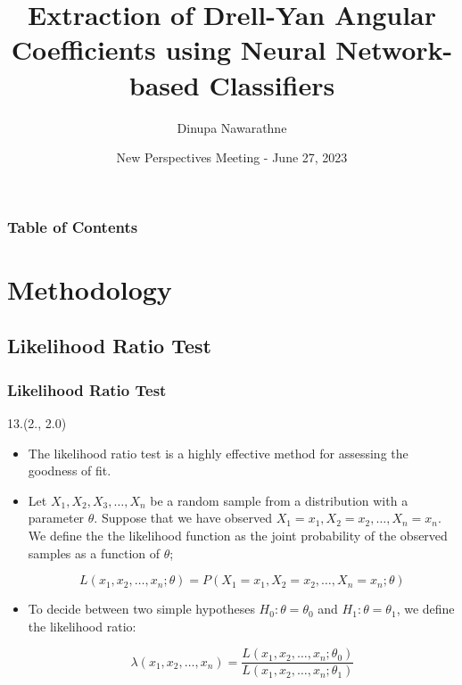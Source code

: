 \documentclass[12pt, xcolor={dvipsnames}, aspectratio = 169, sans,mathserif]{beamer}
\newenvironment{List}[2]
{\begin{textblock}{#1}#2
\begin{itemize}}
{\end{itemize}
\end{textblock}}
\begin{document}
\title{Extraction of Drell-Yan Angular Coefficients using Neural Network-based Classifiers}
\author{Dinupa Nawarathne}

\date{New Perspectives Meeting - June 27, 2023}


\begin{frame}
  \maketitle
\end{frame}

\begin{frame}
\frametitle{Table of Contents}
\tableofcontents
\end{frame}

\section{Methodology}
\subsection{Likelihood Ratio Test}

\begin{frame}
\frametitle{Likelihood Ratio Test}

\begin{List}{13.}{(2., 2.0)}

  \item The likelihood ratio test is a highly effective method for assessing the goodness of fit.

  \item Let $X_1, X_2, X_3, \ldots, X_n$ be a random sample from a distribution with a parameter $\theta$. Suppose that
  we have observed $X_1 = x_1, X_2 = x_2, \ldots, X_n = x_n$. We define the the likelihood function as the joint probability of
  the observed samples as a function of $\theta$;

  \begin{equation*}
  L(x_1, x_2, \ldots, x_n; \theta) = P(X_1=x_1, X_2=x_2, \ldots, X_n=x_n; \theta)
  \end{equation*}

  \item To decide between two simple hypotheses $H_0: \theta = \theta_0$
  and $H_1: \theta = \theta_1$, we define the likelihood ratio:

  \begin{equation*}
  \lambda(x_1, x_2, \ldots, x_n) = \frac{L(x_1, x_2, \ldots, x_n; \theta_0)}{L(x_1, x_2, \ldots, x_n; \theta_1)}
  \end{equation*}

\end{List}

\end{frame}
\end{document}
